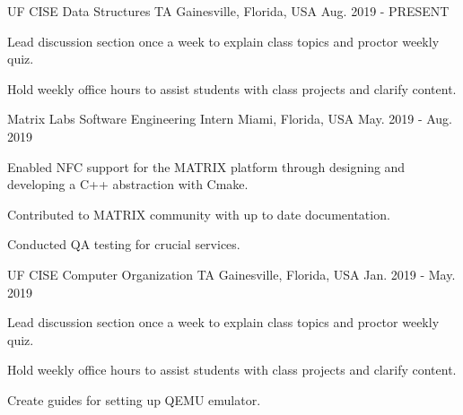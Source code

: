 
\begin{cventries}

  \cventry
    {UF CISE} %
    {Data Structures TA} %
    {Gainesville, Florida, USA} %
    {Aug. 2019 - PRESENT} %
    {
      \begin{cvitems} %
        \item {Lead discussion section once a week to explain class topics and proctor weekly quiz.}
        \item {Hold weekly office hours to assist students with class projects and clarify content.}
      \end{cvitems}
    }


  \cventry
    {Matrix Labs} %
    {Software Engineering Intern} %
    {Miami, Florida, USA} %
    {May. 2019 - Aug. 2019} %
    {
      \begin{cvitems} %
        \item {Enabled NFC support for the MATRIX platform through designing and developing a C++ abstraction with Cmake.}
        \item {Contributed to MATRIX community with up to date documentation.}
        \item {Conducted QA testing for crucial services.}
      \end{cvitems}
    }


  \cventry
    {UF CISE} %
    {Computer Organization TA} %
    {Gainesville, Florida, USA} %
    {Jan. 2019 - May. 2019} %
    {
      \begin{cvitems} %
        \item {Lead discussion section once a week to explain class topics and proctor weekly quiz.}
        \item {Hold weekly office hours to assist students with class projects and clarify content.}
        \item {Create guides for setting up QEMU emulator.}
      \end{cvitems}
    }


\end{cventries}
